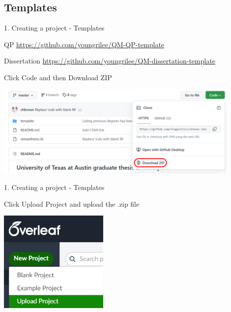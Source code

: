 \documentclass[13pt]{beamer}
\newcommand{\itemA}{\item[\textcolor{black}{\textbullet}]}
\newcommand{\itemB}{\item[\textcolor{black}{\textopenbullet}]}
\newcommand{\green}{\textcolor{colorgreen}}
\begin{document}
\subsection{Templates}
\begin{frame}{1. Creating a project - Templates} 

 \begin{fullpageitemize}
    \itemA QP
    \green{\scriptsize{\url{https://github.com/youngrilee/QM-QP-template}}}
    \itemA Dissertation \green{\scriptsize{\url{https://github.com/youngrilee/QM-dissertation-template}}}\hfill \break
    \begin{fullpageitemize}
    \itemB Click \green{Code} and then \green{Download ZIP}
    \end{fullpageitemize}
    \includegraphics[width=0.9\textwidth,keepaspectratio]{images/git_download.png}
 \end{fullpageitemize}
 
\end{frame}

\begin{frame}{1. Creating a project - Templates} 

 \begin{fullpageitemize}
    \itemA  Click \green{Upload Project} and upload the .zip file \hfill \break 
    
    \includegraphics[width=0.4\textwidth,keepaspectratio]{images/upload_proj.png}
 \end{fullpageitemize}
 
\end{frame}
\end{document}
